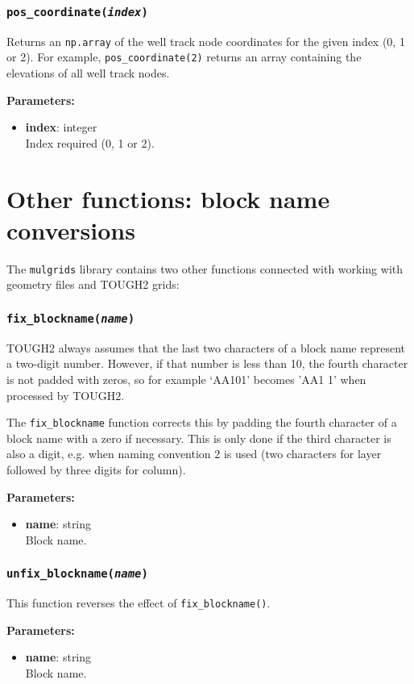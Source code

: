 \subsubsection{\texttt{pos\_coordinate(\emph{index})}}

Returns an \texttt{np.array} of the well track node coordinates for the given index (0, 1 or 2).  For example, \texttt{pos\_coordinate(2)} returns an array containing the elevations of all well track nodes.

\textbf{Parameters:}
\begin{itemize}
\item \textbf{index}: integer\\
  Index required (0, 1 or 2).
\end{itemize}

\section{Other functions: block name conversions}

The \texttt{mulgrids} library contains two other functions connected with working with geometry files and TOUGH2 grids:

\subsubsection{\texttt{fix\_blockname(\emph{name})}}

TOUGH2 always assumes that the last two characters of a block name represent a two-digit number.  However, if that number is less than 10, the fourth character is not padded with zeros, so for example `AA101' becomes 'AA1 1' when processed by TOUGH2.

The \texttt{fix\_blockname} function corrects this by padding the fourth character of a block name with a zero if necessary.  This is only done if the third character is also a digit, e.g. when naming convention 2 is used (two characters for layer followed by three digits for column).

\textbf{Parameters:}
\begin{itemize}
\item \textbf{name}: string\\
  Block name.
\end{itemize}

\subsubsection{\texttt{unfix\_blockname(\emph{name})}}

This function reverses the effect of \texttt{fix\_blockname()}.

\textbf{Parameters:}
\begin{itemize}
\item \textbf{name}: string\\
  Block name.
\end{itemize}

